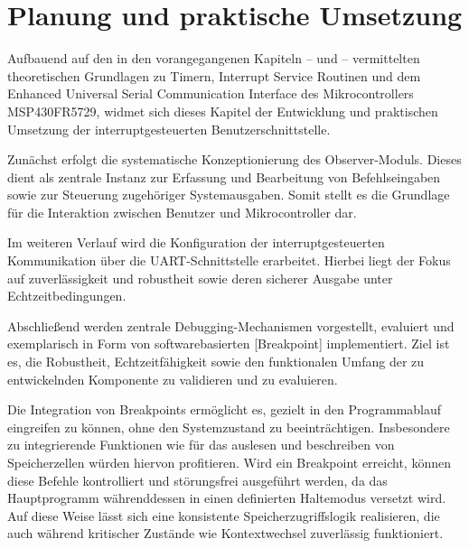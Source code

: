 

\chapter{Planung und praktische Umsetzung}
\label{cha:Entwicklung}

Aufbauend auf den in den vorangegangenen Kapiteln --  und  -- vermittelten theoretischen Grundlagen zu Timern, Interrupt Service Routinen und dem Enhanced Universal Serial Communication Interface des Mikrocontrollers MSP430FR5729, widmet sich dieses Kapitel der Entwicklung und praktischen Umsetzung der interruptgesteuerten Benutzerschnittstelle.

Zun\"achst erfolgt die systematische Konzeptionierung des \glqq{}Observer-Moduls\grqq{}. Dieses dient als zentrale Instanz zur Erfassung und Bearbeitung von Befehlseingaben sowie zur Steuerung zugeh\"origer Systemausgaben. Somit stellt es die Grundlage f\"ur die Interaktion zwischen Benutzer und Mikrocontroller dar.

Im weiteren Verlauf wird die Konfiguration der interruptgesteuerten Kommunikation \"uber die UART-Schnittstelle erarbeitet. Hierbei liegt der Fokus auf zuverl\"assigkeit und robustheit sowie deren sicherer Ausgabe unter Echtzeitbedingungen.

Abschlie{\ss}end werden zentrale Debugging-Mechanismen vorgestellt, evaluiert und exemplarisch in Form von softwarebasierten [Breakpoint] implementiert. Ziel ist es, die Robustheit, Echtzeitf\"ahigkeit sowie den funktionalen Umfang der zu entwickelnden Komponente zu validieren und zu evaluieren.

Die Integration von Breakpoints erm\"oglicht es, gezielt in den Programmablauf eingreifen zu k\"onnen, ohne den Systemzustand zu beeintr\"achtigen. Insbesondere zu integrierende Funktionen wie \zB f\"ur das auslesen und beschreiben von Speicherzellen w\"urden hiervon profitieren. Wird ein Breakpoint erreicht, k\"onnen diese Befehle kontrolliert und st\"orungsfrei ausgef\"uhrt werden, da das Hauptprogramm w\"ahrenddessen in einen definierten Haltemodus versetzt wird. Auf diese Weise l\"asst sich eine konsistente Speicherzugriffslogik realisieren, die auch w\"ahrend kritischer Zust\"ande wie Kontextwechsel zuverl\"assig funktioniert.\AI


